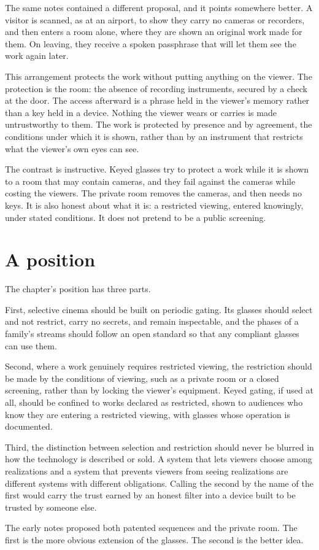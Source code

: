 The same notes contained a different proposal, and it points somewhere better. A visitor is scanned, as at an airport, to show they carry no cameras or recorders, and then enters a room alone, where they are shown an original work made for them. On leaving, they receive a spoken passphrase that will let them see the work again later.

This arrangement protects the work without putting anything on the viewer. The protection is the room: the absence of recording instruments, secured by a check at the door. The access afterward is a phrase held in the viewer's memory rather than a key held in a device. Nothing the viewer wears or carries is made untrustworthy to them. The work is protected by presence and by agreement, the conditions under which it is shown, rather than by an instrument that restricts what the viewer's own eyes can see.

The contrast is instructive. Keyed glasses try to protect a work while it is shown to a room that may contain cameras, and they fail against the cameras while costing the viewers. The private room removes the cameras, and then needs no keys. It is also honest about what it is: a restricted viewing, entered knowingly, under stated conditions. It does not pretend to be a public screening.

\section{A position}

The chapter's position has three parts.

First, selective cinema should be built on periodic gating. Its glasses should select and not restrict, carry no secrets, and remain inspectable, and the phases of a family's streams should follow an open standard so that any compliant glasses can use them.

Second, where a work genuinely requires restricted viewing, the restriction should be made by the conditions of viewing, such as a private room or a closed screening, rather than by locking the viewer's equipment. Keyed gating, if used at all, should be confined to works declared as restricted, shown to audiences who know they are entering a restricted viewing, with glasses whose operation is documented.

Third, the distinction between selection and restriction should never be blurred in how the technology is described or sold. A system that lets viewers choose among realizations and a system that prevents viewers from seeing realizations are different systems with different obligations. Calling the second by the name of the first would carry the trust earned by an honest filter into a device built to be trusted by someone else.

The early notes proposed both patented sequences and the private room. The first is the more obvious extension of the glasses. The second is the better idea.
